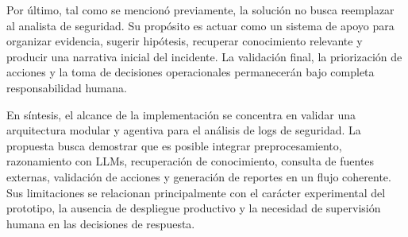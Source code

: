 Por último, tal como se mencionó previamente, la solución no busca reemplazar al analista de seguridad. Su propósito es actuar como un sistema de apoyo para organizar evidencia, sugerir hipótesis, recuperar conocimiento relevante y producir una narrativa inicial del incidente. La validación final, la priorización de acciones y la toma de decisiones operacionales permanecerán bajo completa responsabilidad humana.

En síntesis, el alcance de la implementación se concentra en validar una arquitectura modular y agentiva para el análisis de logs de seguridad. La propuesta busca demostrar que es posible integrar preprocesamiento, razonamiento con LLMs, recuperación de conocimiento, consulta de fuentes externas, validación de acciones y generación de reportes en un flujo coherente. Sus limitaciones se relacionan principalmente con el carácter experimental del prototipo, la ausencia de despliegue productivo y la necesidad de supervisión humana en las decisiones de respuesta.
